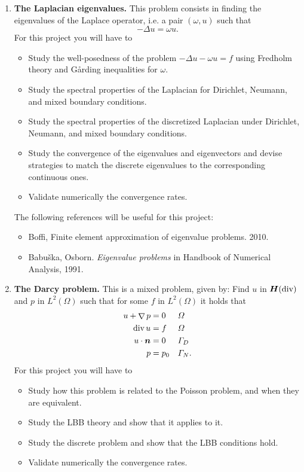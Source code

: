 \documentclass{article}
\renewcommand{\vec}{\vectorsym}
\DeclareMathOperator{\grad}{\nabla}
\DeclareMathOperator{\dive}{\text{div}}
\begin{document}
\begin{enumerate}
    \item \textbf{The Laplacian eigenvalues.} This problem consists in finding the eigenvalues of the Laplace operator, i.e. a pair $(\omega, u)$ such that
        $$-\Delta u = \omega u.$$
        For this project you will have to 
        \begin{itemize}
            \item Study the well-posedness of the problem $-\Delta u - \omega u = f$ using Fredholm theory and G\r arding inequalities for $\omega$.
            \item Study the spectral properties of the Laplacian for Dirichlet, Neumann, and mixed boundary conditions.
            \item Study the spectral properties of the discretized Laplacian under Dirichlet, Neumann, and mixed boundary conditions.
            \item Study the convergence of the eigenvalues and eigenvectors and devise strategies to match the discrete eigenvalues to the corresponding continuous ones.
            \item Validate numerically the convergence rates.
        \end{itemize}
        The following references will be useful for this project:
        \begin{itemize}
            \item Boffi, Finite element approximation of eigenvalue problems. 2010. 
            \item Babu\v{s}ka, Osborn. \emph{Eigenvalue problems} in Handbook of Numerical Analysis, 1991.
        \end{itemize}

    \item \textbf{The Darcy problem.} This is a mixed problem, given by: Find $u$ in $\vec H(\dive)$ and $p$ in $L^2(\Omega)$ such that for some $f$ in $L^2(\Omega)$ it holds that
        $$ \begin{aligned}
            u + \grad p &= 0 && \Omega \\
            \dive u     &= f && \Omega \\
            u\cdot \vec n &= 0 && \Gamma_D \\
            p           &= p_0 && \Gamma_N.
        \end{aligned} $$
        For this project you will have to 
        \begin{itemize}
            \item Study how this problem is related to the Poisson problem, and when they are equivalent.
            \item Study the LBB theory and show that it applies to it.
            \item Study the discrete problem and show that the LBB conditions hold.
            \item Validate numerically the convergence rates.
        \end{itemize}


\end{enumerate}
\end{document}
